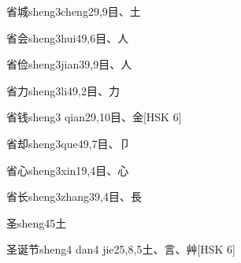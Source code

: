 \begin{EntryWithPhonetic}{省城}{sheng3cheng2}{9,9}{⽬、⼟}
\end{EntryWithPhonetic}

\begin{EntryWithPhonetic}{省会}{sheng3hui4}{9,6}{⽬、⼈}
\end{EntryWithPhonetic}

\begin{EntryWithPhonetic}{省俭}{sheng3jian3}{9,9}{⽬、⼈}
\end{EntryWithPhonetic}

\begin{EntryWithPhonetic}{省力}{sheng3li4}{9,2}{⽬、⼒}
\end{EntryWithPhonetic}

\begin{EntryWithPhonetic}{省钱}{sheng3 qian2}{9,10}{⽬、⾦}[HSK 6]
\end{EntryWithPhonetic}

\begin{EntryWithPhonetic}{省却}{sheng3que4}{9,7}{⽬、⼙}
\end{EntryWithPhonetic}

\begin{EntryWithPhonetic}{省心}{sheng3xin1}{9,4}{⽬、⼼}
\end{EntryWithPhonetic}

\begin{EntryWithPhonetic}{省长}{sheng3zhang3}{9,4}{⽬、⾧}
\end{EntryWithPhonetic}

\begin{EntryWithPhonetic}{圣}{sheng4}{5}{⼟}
\end{EntryWithPhonetic}

\begin{EntryWithPhonetic}{圣诞节}{sheng4 dan4 jie2}{5,8,5}{⼟、⾔、⾋}[HSK 6]
\end{EntryWithPhonetic}

